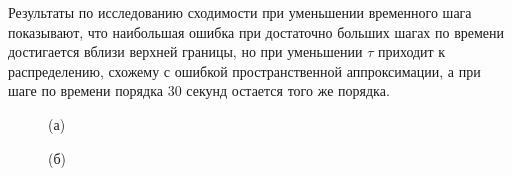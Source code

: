 \documentclass[14pt, a4paper]{extarticle}
\begin{document}
Результаты по исследованию сходимости при уменьшении временного шага показывают, что наибольшая ошибка при достаточно больших шагах по времени достигается вблизи верхней границы, но при уменьшении $\tau$ приходит к распределению, схожему с ошибкой пространственной аппроксимации, а при шаге по времени порядка $30$ секунд остается того же порядка. 

\begin{figure}[H]

(а) 

\end{figure}

\begin{figure}[H]

(б)

\end{figure}
\end{document}

